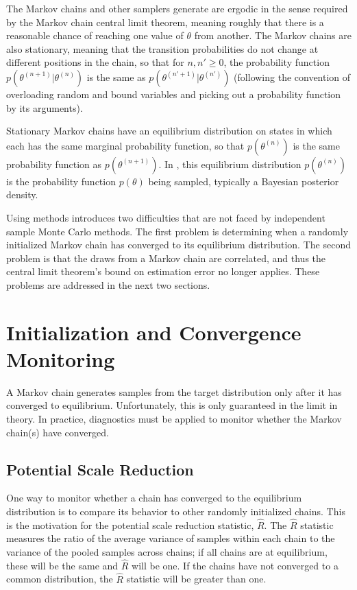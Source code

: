 The Markov chains \Stan and other \MCMC samplers generate are ergodic
in the sense required by the Markov chain central limit theorem,
meaning roughly that there is a reasonable chance of reaching
one value of $\theta$ from another.  The Markov chains are also
stationary, meaning that the transition probabilities do not change at
different positions in the chain, so that for $n, n' \geq 0$, the
probability function $p(\theta^{(n+1)}|\theta^{(n)})$ is the same as
$p(\theta^{(n'+1)}|\theta^{(n')})$ (following the convention of
overloading random and bound variables and picking out a probability
function by its arguments).

Stationary Markov chains have an equilibrium distribution on states in
which each has the same marginal probability function, so that
$p(\theta^{(n)})$ is the same probability function as
$p(\theta^{(n+1)})$.  In \Stan, this equilibrium distribution
$p(\theta^{(n)})$ is the probability function $p(\theta)$ being
sampled, typically a Bayesian posterior density.

Using \MCMC methods introduces two difficulties that are not faced by
independent sample Monte Carlo methods.  The first problem is determining
when a randomly initialized Markov chain has converged to its
equilibrium distribution.  The second problem is that the draws from a
Markov chain are correlated, and thus the central limit theorem's
bound on estimation error no longer applies.  These problems are
addressed in the next two sections.


\section{Initialization and Convergence Monitoring}\label{convergence.section}

A Markov chain generates samples from the target distribution only
after it has converged to equilibrium.  Unfortunately, this is only
guaranteed in the limit in theory.  In practice, diagnostics must be
applied to monitor whether the Markov chain(s) have converged.

\subsection{Potential Scale Reduction}

One way to monitor whether a chain has converged to the equilibrium
distribution is to compare its behavior to other randomly initialized
chains.  This is the motivation for the \cite{GelmanRubin:1992}
potential scale reduction statistic, $\hat{R}$.  The $\hat{R}$
statistic measures the ratio of the average variance of samples within
each chain to the variance of the pooled samples across chains; if all
chains are at equilibrium, these will be the same and $\hat{R}$ will
be one.  If the chains have not converged to a common distribution,
the $\hat{R}$ statistic will be greater than one.


